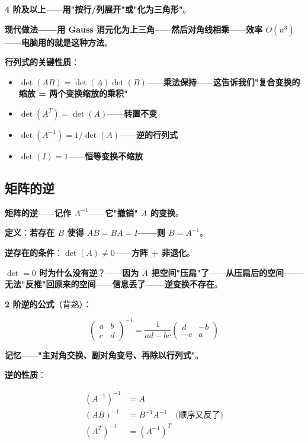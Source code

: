 \textbf{4 阶及以上}——\textbf{用"按行/列展开"或"化为三角形"}。

\textbf{现代做法——用 Gauss 消元化为上三角}——\textbf{然后对角线相乘}——\textbf{效率 $O(n^3)$}——\textbf{电脑用的就是这种方法}。

\textbf{行列式的关键性质}：

\begin{itemize}
\item \textbf{$\det(AB) = \det(A) \det(B)$}——\textbf{乘法保持}——\textbf{这告诉我们"复合变换的缩放 = 两个变换缩放的乘积"}
\item \textbf{$\det(A^T) = \det(A)$}——\textbf{转置不变}
\item \textbf{$\det(A^{-1}) = 1/\det(A)$}——\textbf{逆的行列式}
\item \textbf{$\det(I) = 1$}——\textbf{恒等变换不缩放}
\end{itemize}

\subsection{矩阵的逆}

\textbf{矩阵的逆}——\textbf{记作 $A^{-1}$}——\textbf{它"撤销" $A$ 的变换}。

\textbf{定义}：\textbf{若存在 $B$ 使得 $AB = BA = I$——则 $B = A^{-1}$}。

\textbf{逆存在的条件}：\textbf{$\det(A) \ne 0$}——\textbf{方阵 + 非退化}。

\textbf{$\det = 0$ 时为什么没有逆}？——\textbf{因为 $A$ 把空间"压扁"了}——\textbf{从压扁后的空间——无法"反推"回原来的空间}——\textbf{信息丢了——逆变换不存在}。

\textbf{2 阶逆的公式}（背熟）：

\[
\begin{pmatrix} a & b \\ c & d \end{pmatrix}^{-1}
= \frac{1}{ad - bc} \begin{pmatrix} d & -b \\ -c & a \end{pmatrix}
\]

\textbf{记忆}——\textbf{"主对角交换、副对角变号、再除以行列式"}。

\textbf{逆的性质}：

\begin{align}
(A^{-1})^{-1} &= A \\
(AB)^{-1} &= B^{-1} A^{-1} \quad \text{(顺序又反了)}\\
(A^T)^{-1} &= (A^{-1})^T
\end{align}

